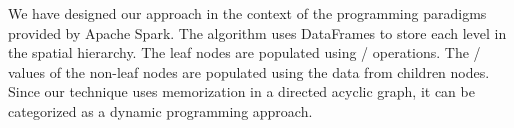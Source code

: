 
We have designed our approach in the context of the programming paradigms provided by Apache Spark. 
The algorithm uses DataFrames to store each level in the spatial hierarchy. 
The leaf nodes are populated using {\aggravation}/{\intervention} operations. 
The {\aggravation}/{\intervention} values of the non-leaf nodes are populated using the data from children nodes. 
Since our technique uses memorization in a directed acyclic graph, it can be categorized as a dynamic programming approach.





